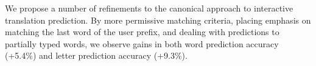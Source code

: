 We propose a number of refinements to the canonical approach to interactive translation prediction. By more permissive matching criteria, placing emphasis on matching the last word of the user prefix, and dealing with predictions to partially typed words, we observe gains in both word prediction accuracy (+5.4\%) and letter prediction accuracy (+9.3\%).
